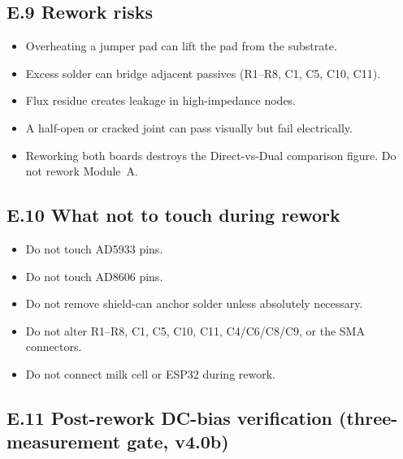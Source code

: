 \documentclass[11pt,a4paper]{article}
\begin{document}
\subsection{E.9 Rework risks}

\begin{riskbox}
\begin{itemize}
\item Overheating a jumper pad can lift the pad from the substrate.
\item Excess solder can bridge adjacent passives (R1--R8, C1, C5, C10, C11).
\item Flux residue creates leakage in high-impedance nodes.
\item A half-open or cracked joint can pass visually but fail electrically.
\item Reworking both boards destroys the Direct-vs-Dual comparison figure. Do not rework Module~A.
\end{itemize}
\end{riskbox}

\subsection{E.10 What not to touch during rework}

\begin{itemize}
\item Do not touch AD5933 pins.
\item Do not touch AD8606 pins.
\item Do not remove shield-can anchor solder unless absolutely necessary.
\item Do not alter R1--R8, C1, C5, C10, C11, C4/C6/C8/C9, or the SMA connectors.
\item Do not connect milk cell or ESP32 during rework.
\end{itemize}

\subsection{E.11 Post-rework DC-bias verification (three-measurement gate, v4.0b)}
\end{document}
